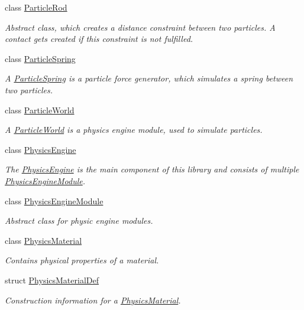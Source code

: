 \begin{DoxyCompactItemize}
class \mbox{\hyperlink{classr3_1_1_particle_rod}{Particle\+Rod}}
\begin{DoxyCompactList}\small\item\em Abstract class, which creates a distance constraint between two particles. A contact gets created if this constraint is not fulfilled. \end{DoxyCompactList}\item 
class \mbox{\hyperlink{classr3_1_1_particle_spring}{Particle\+Spring}}
\begin{DoxyCompactList}\small\item\em A \mbox{\hyperlink{classr3_1_1_particle_spring}{Particle\+Spring}} is a particle force generator, which simulates a spring between two particles. \end{DoxyCompactList}\item 
class \mbox{\hyperlink{classr3_1_1_particle_world}{Particle\+World}}
\begin{DoxyCompactList}\small\item\em A \mbox{\hyperlink{classr3_1_1_particle_world}{Particle\+World}} is a physics engine module, used to simulate particles. \end{DoxyCompactList}\item 
class \mbox{\hyperlink{classr3_1_1_physics_engine}{Physics\+Engine}}
\begin{DoxyCompactList}\small\item\em The \mbox{\hyperlink{classr3_1_1_physics_engine}{Physics\+Engine}} is the main component of this library and consists of multiple \mbox{\hyperlink{classr3_1_1_physics_engine_module}{Physics\+Engine\+Module}}. \end{DoxyCompactList}\item 
class \mbox{\hyperlink{classr3_1_1_physics_engine_module}{Physics\+Engine\+Module}}
\begin{DoxyCompactList}\small\item\em Abstract class for physic engine modules. \end{DoxyCompactList}\item 
class \mbox{\hyperlink{classr3_1_1_physics_material}{Physics\+Material}}
\begin{DoxyCompactList}\small\item\em Contains physical properties of a material. \end{DoxyCompactList}\item 
struct \mbox{\hyperlink{structr3_1_1_physics_material_def}{Physics\+Material\+Def}}
\begin{DoxyCompactList}\small\item\em Construction information for a \mbox{\hyperlink{classr3_1_1_physics_material}{Physics\+Material}}. \end{DoxyCompactList}\item 

\end{DoxyCompactItemize}
